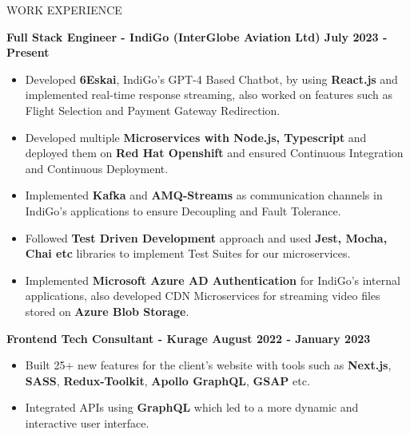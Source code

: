\documentclass{resume} %
\begin{document}







\begin{rSection}{WORK EXPERIENCE}

{\bf Full Stack Engineer - IndiGo (InterGlobe Aviation Ltd)  \hfill July 2023 - Present }
\begin{itemize}
    \item {\normalfont Developed \textbf{6Eskai}, IndiGo's GPT-4 Based Chatbot, by using \textbf{React.js} and implemented real-time response streaming, also worked on features such as Flight Selection and Payment Gateway Redirection.}
    \item {\normalfont Developed multiple \textbf{Microservices with Node.js, Typescript} and deployed them on \textbf{Red Hat Openshift} and ensured Continuous Integration and Continuous Deployment.}
    \item {\normalfont Implemented \textbf{Kafka} and \textbf{AMQ-Streams} as communication channels in IndiGo's applications to ensure Decoupling and Fault Tolerance.}
    \item {\normalfont Followed \textbf{Test Driven Development} approach and used \textbf{Jest, Mocha, Chai etc} libraries to implement Test Suites for our microservices.}
    \item {\normalfont Implemented \textbf{Microsoft Azure AD Authentication} for IndiGo's internal applications, also developed CDN Microservices for streaming video files stored on \textbf{Azure Blob Storage}.}
\end{itemize}


{\bf Frontend Tech Consultant - Kurage  \hfill August 2022 - January 2023 }
\begin{itemize}

    \item {\normalfont  Built 25+ new features for the client's website with tools such as \textbf{{Next.js}}, \textbf{{SASS}}, \textbf{{Redux-Toolkit}}, \textbf{{Apollo GraphQL}}, \textbf{{GSAP}} etc. }
   \item {\normalfont Integrated APIs using \textbf{{GraphQL}} which led to a more dynamic and interactive user interface.} 
 
\end{itemize}

\end{rSection}
\end{document}

